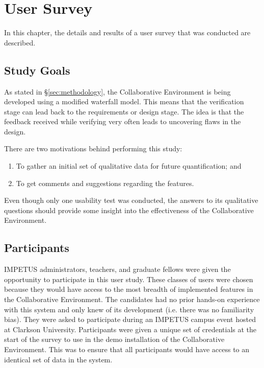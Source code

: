 \chapter{User Survey}
\label{chap:usability}

In this chapter, the details and results of a user survey that was conducted are described.

\section{Study Goals}
As stated in \S \ref{sec:methodology}, the Collaborative Environment is being developed using a modified waterfall model. This means that the verification stage can lead back to the requirements or design stage. The idea is that the feedback received while verifying very often leads to uncovering flaws in the design.

There are two motivations behind performing this study:
\begin{enumerate}
	\item To gather an initial set of qualitative data for future quantification; and
	\item To get comments and suggestions regarding the features.
\end{enumerate}

Even though only one usability test was conducted, the answers to its qualitative questions should provide some insight into the effectiveness of the Collaborative Environment.

\section{Participants}
IMPETUS administrators, teachers, and graduate fellows were given the opportunity to participate in this user study. These classes of users were chosen because they would have access to the most breadth of implemented features in the Collaborative Environment. The candidates had no prior hands-on experience with this system and only knew of its development (i.e. there was no familiarity bias). They were asked to participate during an IMPETUS campus event hosted at Clarkson University. Participants were given a unique set of credentials at the start of the survey to use in the demo installation of the Collaborative Environment. This was to ensure that all participants would have access to an identical set of data in the system.

